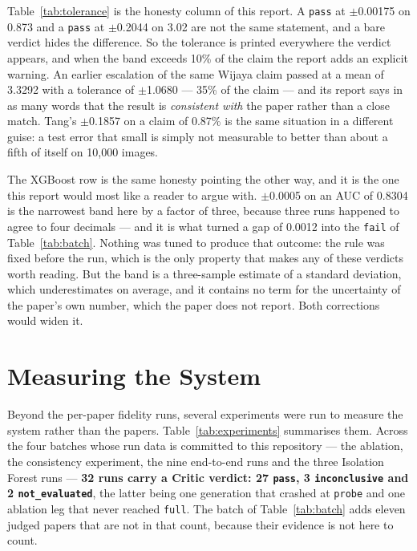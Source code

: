 \documentclass[10pt,twocolumn]{article}
\begin{document}
Table~\ref{tab:tolerance} is the honesty column of this report. A \texttt{pass} at $\pm$0.00175 on
0.873 and a \texttt{pass} at $\pm$0.2044 on 3.02 are not the same statement, and a bare verdict
hides the difference. So the tolerance is printed everywhere the verdict appears, and when the
band exceeds 10\% of the claim the report adds an explicit warning. An earlier escalation of the
same Wijaya claim passed at a mean of 3.3292 with a tolerance of $\pm$1.0680 --- 35\% of the claim
--- and its report says in as many words that the result is \emph{consistent with} the paper rather
than a close match. Tang's $\pm$0.1857 on a claim of 0.87\% is the same situation in a different
guise: a test error that small is simply not measurable to better than about a fifth of itself on
10{,}000 images.

The XGBoost row is the same honesty pointing the other way, and it is the one this report would
most like a reader to argue with. $\pm$0.0005 on an AUC of 0.8304 is the narrowest band here by a
factor of three, because three runs happened to agree to four decimals --- and it is what turned a
gap of 0.0012 into the \texttt{fail} of Table~\ref{tab:batch}. Nothing was tuned to produce that
outcome: the rule was fixed before the run, which is the only property that makes any of these
verdicts worth reading. But the band is a three-sample estimate of a standard deviation, which
underestimates on average, and it contains no term for the uncertainty of the paper's own
number, which the paper does not report. Both corrections would widen it.

\section{Measuring the System}
\label{sec:experiments}

Beyond the per-paper fidelity runs, several experiments were run to measure the system rather than
the papers. Table~\ref{tab:experiments} summarises them. Across the four batches whose run data is
committed to this repository --- the ablation, the consistency experiment, the nine end-to-end runs
and the three Isolation Forest runs --- \textbf{32 runs carry a Critic verdict: 27
\texttt{pass}, 3 \texttt{inconclusive} and 2 \texttt{not\_evaluated}}, the latter being one
generation that crashed at \texttt{probe} and one ablation leg that never reached \texttt{full}.
The batch of Table~\ref{tab:batch} adds eleven judged papers that are not in that count, because
their evidence is not here to count.
\end{document}
